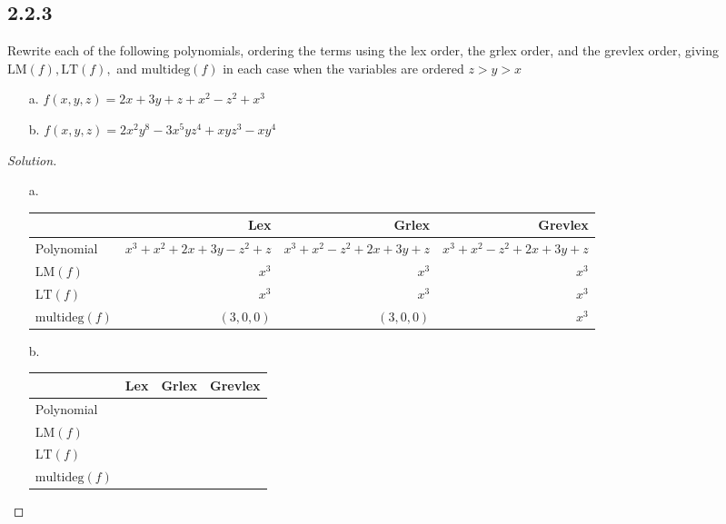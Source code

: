 \documentclass[]{article}
\newcommand\<{\langle}
\renewcommand\>{\rangle}
\newenvironment{solution}
{
	\begin{proof}[Solution] \text{ }
		\\
	}
	{
	\end{proof}
}
\begin{document}
\subsection*{2.2.3} Rewrite each of the following polynomials, ordering the terms using the lex order, the grlex order, and the grevlex order, giving $\text{LM}(f), \text{LT}(f),$ and $\text{multideg}(f)$ in each case when the variables are ordered $z > y > x$
\begin{enumerate}
	\item[a.] $f(x, y, z) = 2x + 3y + z + x^2 -z^2 + x^3$
	\item[b.] $f(x, y, z) = 2x^2y^8 - 3x^5yz^4 + xyz^3 - xy^4$
\end{enumerate}
\begin{solution}
\begin{enumerate}
	\item[a.] \text{ } \\
	\begin{tabular}{l|r|r|r}
		 & Lex & Grlex & Grevlex \\
		\hline
		Polynomial & $x^3 + x^2 + 2x + 3y - z^2 + z$ & $x^3 + x^2- z^2 + 2x + 3y + z$ & $x^3 + x^2 - z^2 + 2x + 3y  + z$\\
		$\text{LM}(f)$ & $x^3$ & $x^3$ & $x^3$\\
		$\text{LT}(f)$ & $x^3$ & $x^3$ & $x^3$\\
		$\text{multideg}(f)$ & $(3,0,0)$ & $(3,0,0)$ & $x^3$
	\end{tabular}
	\item[b.] \text{ } \\
	\begin{tabular}{l|r|r|r}
		& Lex & Grlex & Grevlex \\
		\hline
		Polynomial & & & \\
		$\text{LM}(f)$ & & & \\
		$\text{LT}(f)$ & & & \\
		$\text{multideg}(f)$ & & &
	\end{tabular}
\end{enumerate}
\end{solution}
\end{document}
